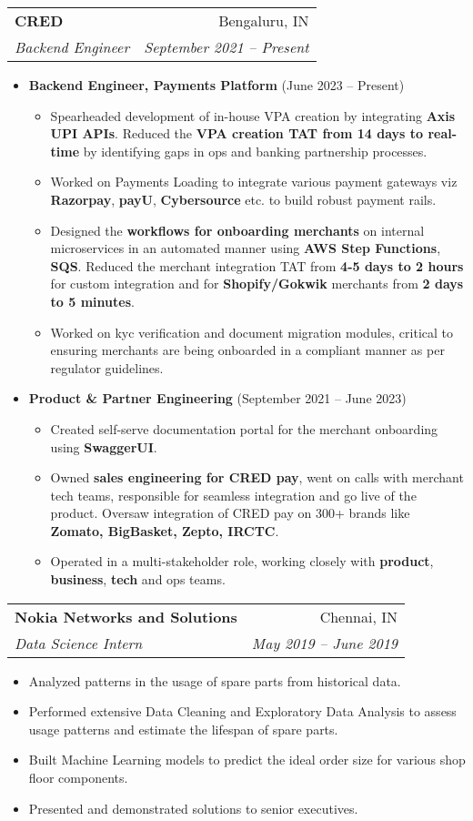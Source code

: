 \documentclass[letterpaper,11pt]{article}
\makeatletter
\newcommand{\resumeItem}[1]{
  \item\small{
    {#1 \vspace{-2pt}}
  }
}
\newcommand{\resumeSubheading}[4]{
  \vspace{-1pt}\item
    \begin{tabular*}{0.97\textwidth}[t]{l@{\extracolsep{\fill}}r}
      \textbf{#1} & #2 \\
      \textit{\small#3} & \textit{\small #4} \\
    \end{tabular*}\vspace{-5pt}
}
\newcommand{\resumeItemListStart}{\begin{itemize}}
\newcommand{\resumeItemListEnd}{\end{itemize}\vspace{-5pt}}
\makeatother
\begin{document}
    \resumeSubheading
      {CRED}{Bengaluru, IN}
      {Backend Engineer}{September 2021 -- Present}
      \resumeItemListStart
        \resumeItem{\textbf{Backend Engineer, Payments Platform} (June 2023 -- Present)}
        \resumeItemListStart
            \resumeItem{Spearheaded development of in-house VPA creation by integrating \textbf{Axis UPI APIs}. Reduced the \textbf{VPA creation TAT from 14 days to real-time} by identifying gaps in ops and banking partnership processes.}
            \resumeItem{Worked on Payments Loading to integrate various payment gateways viz \textbf{Razorpay}, 
            \textbf{payU}, \textbf{Cybersource} etc. to build robust payment rails.}
            \resumeItem{Designed the \textbf{workflows for onboarding merchants} on internal microservices in an automated manner using \textbf{AWS Step Functions}, \textbf{SQS}. Reduced the merchant integration TAT from \textbf{4-5 days to 2 hours} for custom integration and for \textbf{Shopify/Gokwik} merchants from \textbf{2 days to 5 minutes}.}
            \resumeItem{Worked on kyc verification and document migration modules, critical to ensuring merchants are being onboarded in a compliant manner as per regulator guidelines.}
        \resumeItemListEnd
        \vspace{\baselineskip}
        \resumeItem{\textbf{Product \& Partner Engineering} (September 2021 -- June 2023)}
         \resumeItemListStart
            \resumeItem{Created self-serve documentation portal for the merchant onboarding using \textbf{SwaggerUI}.}
            \resumeItem{Owned \textbf{sales engineering for CRED pay}, went on calls with merchant tech teams, responsible for seamless integration and go live of the product. Oversaw integration of CRED pay on 300+ brands like \textbf{Zomato, BigBasket, Zepto, IRCTC}.}
            \resumeItem{Operated in a multi-stakeholder role, working closely with \textbf{product}, \textbf{business}, \textbf{tech} and ops teams.}
        \resumeItemListEnd
      \resumeItemListEnd

    \resumeSubheading
      {Nokia Networks and Solutions}{Chennai, IN}
      {Data Science Intern}{May 2019 -- June 2019}
      \resumeItemListStart
        \resumeItem{Analyzed patterns in the usage of spare parts from historical data.}
        \resumeItem{Performed extensive Data Cleaning and Exploratory Data Analysis to assess usage patterns and estimate the lifespan of spare parts.}
        \resumeItem{Built Machine Learning models to predict the ideal order size for various shop floor components.}
        \resumeItem{Presented and demonstrated solutions to senior executives.}
      \resumeItemListEnd
\end{document}
